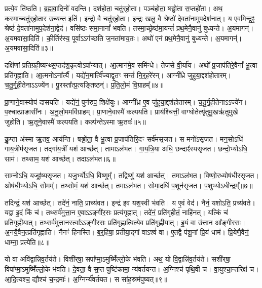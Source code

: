 प्रत्ये॒व ति॑ष्ठति।
ब्र॒ह्म॒वा॒दिनो॑ वदन्ति।
दश॑होता॒ चतु॑र्‌\mbox{}होता।
पञ्च॑होता॒ षड्ढो॑ता स॒प्तहो॑ता।
अथ॒ कस्मा॒च्चतु॑र्‌\mbox{}होतार उच्यन्त॒ इति॑।
इन्द्रो॒ वै चतु॑र्‌\mbox{}होता।
इन्द्रः॒ खलु॒ वै श्रेष्ठो॑ दे॒वता॑नामुप॒\-देश॑नात्।
य ए॒वमिन्द्र॒ꣴ॒ श्रेष्ठं॑ दे॒वता॑नामुप॒\-देश॑ना॒द्वेद॑।
वसि॑ष्ठः समा॒नानां᳚ भवति।
तस्मा॒च्छ्रेष्ठ॑मा॒यन्तं॑ प्रथ॒मेनै॒वानु॑ बुध्यन्ते।
अ॒यमागन्॑।
अ॒यमवा॑सा॒दिति॑।
की॒र्तिर॑स्य॒ पूर्वा\-ऽऽग॑च्छति ज॒नता॑माय॒तः।
अथो॑ एनं प्रथ॒मेनै॒वानु॑ बुध्यन्ते।
अ॒यमागन्॑।
अ॒यमवा॑सा॒दिति॑॥३॥\anuvakamend[स॒प्तहो॑ता प्रति॒ष्ठां वेद॑ बुध्यन्ते॒ षट्च॑]

दक्षि॑णां प्रतिग्रही॒ष्यन्थ्स॒प्तद॑श॒कृत्वो\-ऽपा᳚न्यात्।
आ॒त्मान॑मे॒व समि॑न्धे।
तेज॑से वी॒र्या॑य।
अथो᳚ प्र॒जा\-प॑तिरे॒वैनां᳚ भू॒त्वा प्रति॑\-गृह्णाति।
आ॒त्मनो\-ऽना᳚र्त्यै।
यद्ये॑न॒मार्त्वि॑ज्याद्वृ॒तꣳ सन्तं॑ नि॒र्‌॒\mbox{}हरे॑रन्।
आग्नी᳚ध्रे जुहुया॒द्दश॑होतारम्।
च॒तु॒र्गृ॒ही॒तेनाऽऽज्ये॑न।
पु॒रस्ता᳚त्प्र॒त्यङ्तिष्ठन्॑।
प्र॒ति॒लो॒मं वि॒ग्राहम्᳚॥४॥

प्रा॒णाने॒वास्योप॑ दासयति।
यद्ये॑नं॒ पुन॑रुप॒ शिक्षे॑युः।
आग्नी᳚ध्र ए॒व जु॑हुया॒द्दश॑होतारम्।
च॒तु॒र्गृ॒ही॒तेनाऽऽज्ये॑न।
प॒श्चात्प्राङासी॑नः।
अ॒नु॒लो॒ममवि॑ग्राहम्।
प्रा॒णाने॒वास्मै॑ कल्पयति।
प्राय॑श्चित्ती॒ वाग्घोतेत्यृ॑तुमु॒खऋ॑तुमुखे जुहोति।
ऋ॒तूने॒वास्मै॑ कल्पयति।
कल्प॑न्ते\-ऽस्मा ऋ॒तवः॑॥५॥

कॢ॒प्ता अ॑स्मा ऋ॒तव॒ आय॑न्ति।
षड्ढो॑ता॒ वै भू॒त्वा प्र॒जा\-प॑तिरि॒दꣳ सर्व॑म\-सृजत।
स मनो॑\-ऽ\-सृजत।
मन॒सोऽधि॑ गाय॒त्रीम॑\-सृजत।
तद्गा॑य॒त्रीं यश॑ आर्च्छत्।
तामाऽल॑भत।
गा॒य॒त्रि॒या अधि॒ छन्दाꣴ॑स्य\-सृजत।
छन्दो॒भ्योऽधि॒ साम॑।
तथ्साम॒ यश॑ आर्च्छत्।
तदाऽल॑भत॥६॥

साम्नोऽधि॒ यजूꣴ॑ष्य\-सृजत।
यजु॒र्भ्योऽधि॒ विष्णुम्᳚।
तद्विष्णुं॒ यश॑ आर्च्छत्।
तमाऽल॑भत।
विष्णो॒रध्योष॑धीर\-सृजत।
ओष॑धी॒भ्योऽधि॒ सोमम्᳚।
तथ्सोमं॒ यश॑ आर्च्छत्।
तमाऽल॑भत।
सोमा॒दधि॑ प॒शून॑\-सृजत।
प॒शुभ्यो\-ऽधीन्द्रम्᳚॥७॥

तदिन्द्रं॒ यश॑ आर्च्छत्।
तदे॑नं॒ नाति॒ प्राच्य॑वत।
इन्द्र॑ इव यश॒स्वी भ॑वति।
य ए॒वं वेद॑।
नैनं॒ यशोऽति॒ प्रच्य॑वते।
यद्वा इ॒दं किं च॑।
तथ्सर्व॑मुत्ता॒न ए॒वा\-ऽऽङ्गी॑र॒सः प्रत्य॑गृह्णात्।
तदे॑नं॒ प्रति॑\-गृहीतं॒ नाहि॑नत्।
यत्किं च॑ प्रतिगृह्णी॒यात्।
तथ्सर्व॑मुत्ता॒नस्त्वा᳚\-ऽऽङ्गीर॒सः प्रति॑\-गृह्णा॒त्वित्ये॒व प्रति॑\-गृह्णीयात्।
इ॒यं वा उ॑त्ता॒न आ᳚ङ्गीर॒सः।
अ॒नयै॒वैन॒त्प्रति॑\-गृह्णाति।
नैनꣳ॑ हिनस्ति।
ब॒र्॒हिषा॒ प्रती॑या॒द्गां वाऽश्वं॑ वा।
ए॒तद्वै प॑शू॒नां प्रि॒यं धाम॑।
प्रि॒येणै॒वैनं॒ धाम्ना॒ प्रत्ये॑ति॥८॥\anuvakamend[वि॒ग्राह॑मृ॒तव॒स्तदा\-ऽल॑भ॒तेन्द्रं॑ गृह्णीया॒थ्षट्च॑]

यो वा अवि॑द्वान्निव॒र्तय॑ते।
विशी॑र्‌\mbox{}षा॒ सपा᳚प्मा॒\-ऽमुष्मिँ॑ल्लो॒के भ॑वति।
अथ॒ यो वि॒द्वान्नि॑व॒र्तय॑ते।
सशी॑र्‌\mbox{}षा॒ विपा᳚प्मा॒\-ऽमुष्मिँ॑ल्लो॒के भ॑वति।
दे॒वता॒ वै स॒प्त पुष्टि॑कामा॒ न्य॑वर्तयन्त।
अ॒ग्निश्च॑ पृथि॒वी च॑।
वा॒युश्चा॒न्तरि॑क्षं च।
आ॒दि॒त्यश्च॒ द्यौश्च॑ च॒न्द्रमाः᳚।
अ॒ग्निर्न्य॑वर्तयत।
स सा॑ह॒स्रम॑पुष्यत्॥९॥

